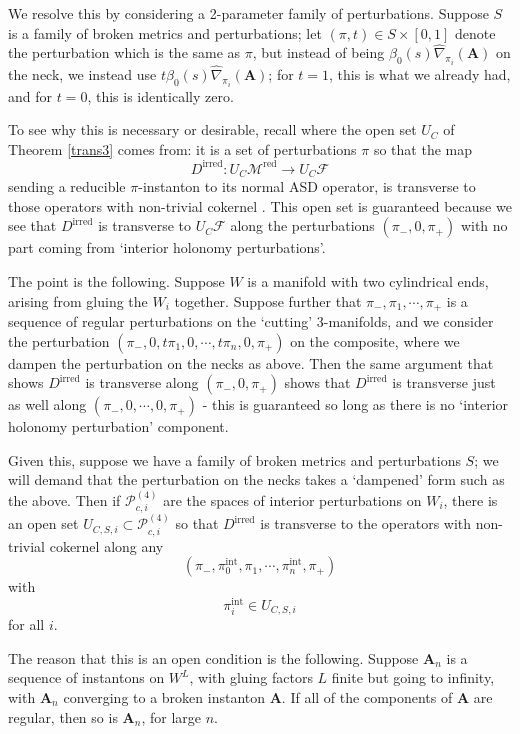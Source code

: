 \documentclass{memo-l}
\theoremstyle{definition}
\theoremstyle{remark}
\numberwithin{section}{chapter}
\numberwithin{equation}{chapter}
\begin{document}
We resolve this by considering a 2-parameter family of perturbations. Suppose $S$ is a family of broken metrics and perturbations; let $(\pi, t) \in S \times [0,1]$ denote the perturbation which is the same as $\pi$, but instead of being $\beta_0(s) \widehat{\nabla}_{\pi_i}(\mathbf{A})$ on the neck, we instead use $t\beta_0(s) \widehat{\nabla}_{\pi_i}(\mathbf{A})$; for $t = 1$, this is what we already had, and for $t = 0$, this is identically zero.

To see why this is necessary or desirable, recall where the open set $U_C$ of Theorem \ref{trans3} comes from: it is a set of perturbations $\pi$ so that the map
$$D^{\text{irred}}: U_C\mathcal M^{\text{red}} \to U_C \mathcal F$$
sending a reducible $\pi$-instanton to its normal ASD operator, is transverse to those operators with non-trivial cokernel . This open set is guaranteed because we see that $D^{\text{irred}}$ is transverse to $U_C \mathcal F$ along the perturbations $(\pi_-, 0, \pi_+)$ with no part coming from `interior holonomy perturbations'.

The point is the following. Suppose $W$ is a manifold with two cylindrical ends, arising from gluing the $W_i$ together. Suppose further that $\pi_-, \pi_1, \cdots, \pi_+$ is a sequence of regular perturbations on the `cutting' 3-manifolds, and we consider the perturbation $(\pi_-, 0, t\pi_1, 0, \cdots, t\pi_n, 0, \pi_+)$ on the composite, where we dampen the perturbation on the necks as above. Then the same argument that shows $D^{\text{irred}}$ is transverse along $(\pi_-, 0, \pi_+)$ shows that $D^{\text{irred}}$ is transverse just as well along $(\pi_-, 0, \cdots, 0, \pi_+)$ - this is guaranteed so long as there is no `interior holonomy perturbation' component.

Given this, suppose we have a family of broken metrics and perturbations $S$; we will demand that the perturbation on the necks takes a `dampened' form such as the above. Then if $\mathcal P^{(4)}_{c,i}$ are the spaces of interior perturbations on $W_i$, there is an open set $U_{C,S,i} \subset \mathcal P^{(4)}_{c,i}$ so that $D^{\text{irred}}$ is transverse to the operators with non-trivial cokernel along any
$$(\pi_-, \pi_0^{\text{int}}, \pi_1, \cdots, \pi_n^{\text{int}}, \pi_+)$$ with
$$\pi_i^{\text{int}} \in U_{C,S,i}$$ for all $i$.

The reason that this is an open condition is the following. Suppose $\mathbf{A}_n$ is a sequence of instantons on $W^L$, with gluing factors $L$ finite but going to infinity, with $\mathbf{A}_n$ converging to a broken instanton $\mathbf{A}$. If all of the components of $\mathbf{A}$ are regular, then so is $\mathbf{A}_n$, for large $n$.
\end{document}
